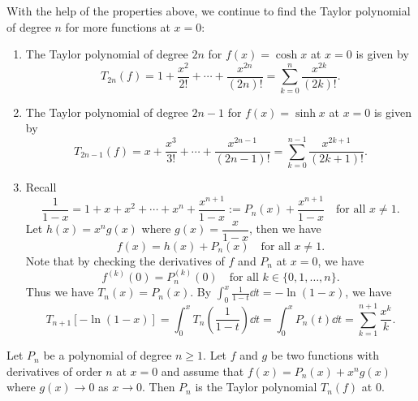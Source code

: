 \documentclass[a4paper]{ctexart}
\begin{document}
    \begin{myex}
        With the help of the properties above, we continue to find the Taylor polynomial of degree $n$ for more functions at $x=0$:
        \begin{enumerate}[label=(\arabic*),start=4]
            \item The Taylor polynomial of degree $2n$ for $f(x)=\cosh x$ at $x=0$ is given by
            \[
            T_{2n}(f) = 1 + \frac{x^2}{2!} + \cdots + \frac{x^{2n}}{(2n)!} = \sum_{k=0}^n \frac{x^{2k}}{(2k)!}.
            \]
            \item The Taylor polynomial of degree $2n-1$ for $f(x)=\sinh x$ at $x=0$ is given by
            \[
            T_{2n-1}(f) = x + \frac{x^3}{3!} + \cdots + \frac{x^{2n-1}}{(2n-1)!} = \sum_{k=0}^{n-1} \frac{x^{2k+1}}{(2k+1)!}.
            \]
            \item Recall
            \[
            \frac1{1-x} = 1 + x + x^2 + \cdots + x^n + \frac{x^{n+1}}{1-x}:=P_n(x)+\frac{x^{n+1}}{1-x} \quad \text{for all } x\neq 1.
            \]
            Let $h(x) = x^n g(x)$ where $g(x) = \dfrac{x}{1-x}$, then we have
            \[
            f(x)=h(x) + P_n(x) \quad \text{for all } x\neq 1.
            \]
            Note that by checking the derivatives of $f$ and $P_n$ at $x=0$, we have
            \[
            f^{(k)}(0) = P_n^{(k)}(0) \quad \text{for all } k\in \{0,1,\ldots,n\}.
            \]
            Thus we have $T_n(x) = P_n(x)$. By $\displaystyle \int_0^x \frac{1}{1-t} \dd t = -\ln(1-x)$, we have
            \[
            T_{n+1}\left[ -\ln(1-x) \right] = \int_0^x T_n\left( \frac{1}{1-t} \right) \dd t = \int_0^x P_n(t) \dd t = \sum_{k=1}^{n+1} \frac{x^k}{k}.
            \]
        \end{enumerate}
    \end{myex}
    \begin{mythm}
        Let $P_n$ be a polynomial of degree $n\ge 1$. Let $f$ and $g$ be two functions with derivatives of order $n$ at $x=0$ and assume that $f(x)=P_n(x)+x^n g(x)$ where $g(x)\to 0$ as $x\to 0$. Then $P_n$ is the Taylor polynomial $T_n(f)$ at 0.
    \end{mythm}
\end{document}
